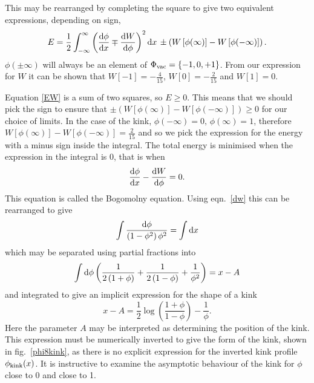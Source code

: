 \documentclass[11pt, oneside]{article}  	%
\numberwithin{equation}{section}
\newcommand{\drv}{\ensuremath{\textup{d}}}
\begin{document}
 This may be rearranged by completing the square to give two equivalent expressions, depending on sign,
 \begin{equation}\label{energy_bogo}
E = \frac{1}{2} \int_{-\infty}^{\infty}\left (  \frac{\textup{d}\phi}{\textup{d}x} \mp \frac{\textup{d}W}{\textup{d}\phi} \right )^2 \drv x  \, \pm \left( W\left [  \phi(\infty)\right ]  -  W\left [  \phi(-\infty)\right ]\right).
 \end{equation}
$\phi(\pm\infty)$ will always be an element of $\Phi_{\textup{vac}} = \left \{ -1,0,+1\right \}$. From our expression for $W$ it can be shown that $W[-1] = -\frac{4}{15}$, $W[0] = -\frac{2}{15}$ and $W[1] = 0$.\par
 Equation \ref{EW} is a sum of two squares, so $E\geqslant 0$. This means that we should pick the sign to ensure that $ \pm \left( W\left [  \phi(\infty)\right ]  -  W\left [  \phi(-\infty)\right ]\right) \geqslant 0$ for our choice of limits. In the case of the kink, $\phi(-\infty) = 0,\, \phi(\infty) = 1 $, therefore $W\left [  \phi(\infty)\right ]  -  W\left [  \phi(-\infty)\right ] = \frac{2}{15}$ and so we pick the expression for the energy with a minus sign inside the integral. The total energy is minimised when the expression in the integral is 0, that is when
 \begin{equation}\label{bogo}
 \frac{\textup{d}\phi}{\textup{d}x} - \frac{\textup{d}W}{\textup{d}\phi} = 0.
 \end{equation}
 This equation is called the Bogomolny equation. Using eqn.~\ref{dw} this can be rearranged to give
 \begin{equation}
 \int \frac{\drv\phi}{\left(1-\phi^2 \right ) \phi^2} = \int \drv x
 \end{equation}
 which may be separated using partial fractions into
 \begin{equation}
 \int\drv\phi \left (\frac{1}{2\left(1+\phi\right )} + \frac{1}{2\left(1-\phi\right )} + \frac{1}{\phi^2} \right) = x -A
 \end{equation}
 and integrated to give an implicit expression for the shape of a kink
 \begin{equation}\label{long_kink_eq}
 x-A = \frac{1}{2}\log\left (\frac{1+\phi}{1-\phi} \right ) - \frac{1}{\phi}.
 \end{equation}
 Here the parameter $A$ may be interpreted as determining the position of the kink. This expression must be numerically inverted to give the form of the kink, shown in fig.~\ref{phi8kink}, as there is no explicit expression for the inverted kink profile $\phi_\textup{kink}(x)$. It is instructive to examine the asymptotic behaviour of the kink for $\phi$ close to 0 and close to 1. \par
\end{document}
